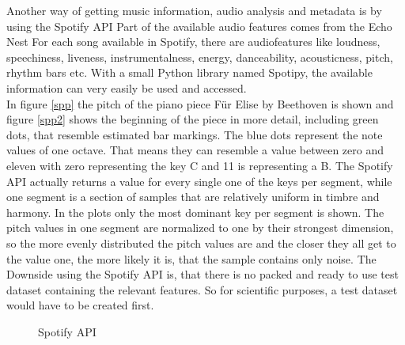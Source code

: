 Another way of getting music information, audio analysis and metadata is by using the Spotify API\cite{spotifyapi1}
Part of the available audio features comes from the Echo Nest\cite{echonest1}
For each song available in Spotify, there are audiofeatures like loudness, speechiness, liveness, instrumentalness, energy, danceability, acousticness, pitch, rhythm bars etc. 
With a small Python library named Spotipy, the available information can very easily be used and accessed. \cite{spotipy1}\\
In figure \ref{spp} the pitch of the piano piece Für Elise by Beethoven is shown and figure \ref{spp2} shows the beginning of the piece in more detail, including green dots, that resemble estimated bar markings. The blue dots represent the note values of one octave. That means they can resemble a value between zero and eleven with zero representing the key C and 11 is representing a B.
The Spotify API actually returns a value for every single one of the keys per segment, while one segment is a section of samples that are relatively uniform in timbre and harmony. In the plots only the most dominant key per segment is shown. 
The pitch values in one segment are normalized to one by their strongest dimension, so the more evenly distributed the pitch values are and the closer they all get to the value one, the more likely it is, that the sample contains only noise.
The Downside using the Spotify API is, that there is no packed and ready to use test dataset containing the relevant features. So for scientific purposes, a test dataset would have to be created first. 

\begin{figure}[htbp]
	\centering
	\caption{Spotify API}
	\label{fig:spotify}
\end{figure}
\FloatBarrier


